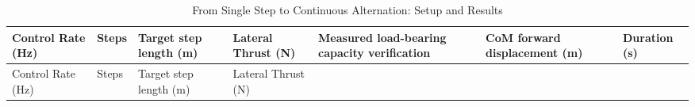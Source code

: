 \FloatBarrier\begingroup\small\setlength{\tabcolsep}{2.5pt}
\begin{longtable}[]{@{}
  >{\raggedright\arraybackslash}p{}
  >{\raggedright\arraybackslash}p{}
  >{\raggedright\arraybackslash}p{}
  >{\raggedright\arraybackslash}p{}
  >{\raggedright\arraybackslash}p{}
  >{\raggedright\arraybackslash}p{}
  >{\raggedright\arraybackslash}p{}@{}}
\caption{From Single Step to Continuous Alternation: Setup and Results}\label{tab:s26-1}\tabularnewline
\toprule\noalign{}
\begin{minipage}[b]{\linewidth}\raggedright
Control Rate (Hz)
\end{minipage} & \begin{minipage}[b]{\linewidth}\raggedright
Steps
\end{minipage} & \begin{minipage}[b]{\linewidth}\raggedright
Target step length (m)
\end{minipage} & \begin{minipage}[b]{\linewidth}\raggedright
Lateral Thrust (N)
\end{minipage} & \begin{minipage}[b]{\linewidth}\raggedright
Measured load-bearing capacity verification
\end{minipage} & \begin{minipage}[b]{\linewidth}\raggedright
CoM forward displacement (m)
\end{minipage} & \begin{minipage}[b]{\linewidth}\raggedright
Duration (s)
\end{minipage} \\
\midrule\noalign{}
\endfirsthead
\toprule\noalign{}
\begin{minipage}[b]{\linewidth}\raggedright
Control Rate (Hz)
\end{minipage} & \begin{minipage}[b]{\linewidth}\raggedright
Steps
\end{minipage} & \begin{minipage}[b]{\linewidth}\raggedright
Target step length (m)
\end{minipage} & \begin{minipage}[b]{\linewidth}\raggedright
Lateral Thrust (N)

\end{minipage}
\end{longtable}
